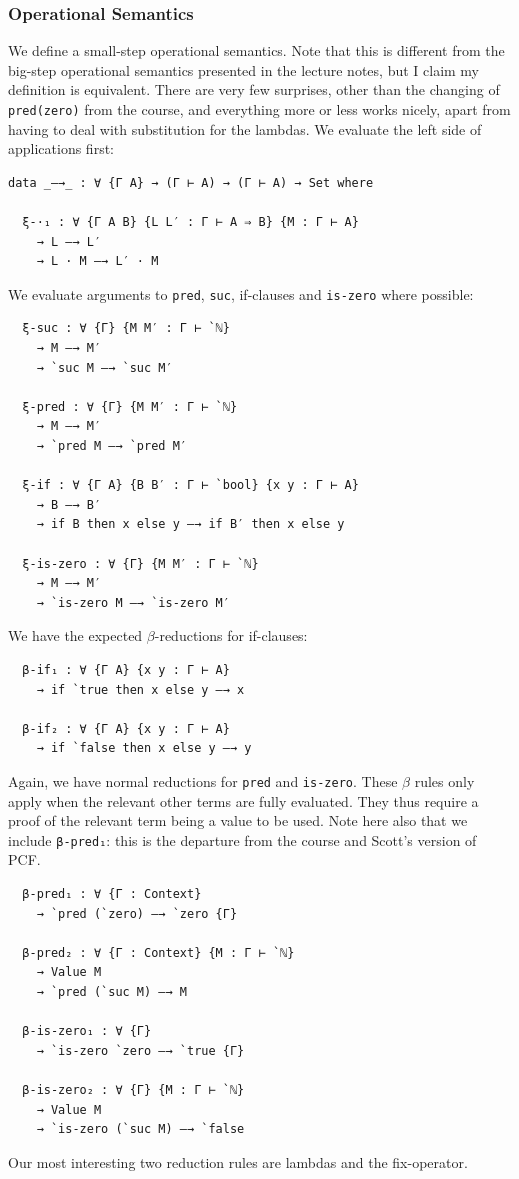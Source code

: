 \documentclass[12pt,a4paper,twoside,openright]{report}
\begin{document}
\subsubsection{Operational Semantics}
We define a small-step operational semantics. Note that this is different from the big-step operational semantics presented in the lecture notes, but I claim my definition is equivalent. There are very few surprises, other than the changing of \texttt{pred(zero)} from the course, and everything more or less works nicely, apart from having to deal with substitution for the lambdas.
We evaluate the left side of applications first:
\begin{verbatim}
data _—→_ : ∀ {Γ A} → (Γ ⊢ A) → (Γ ⊢ A) → Set where

  ξ-·₁ : ∀ {Γ A B} {L L′ : Γ ⊢ A ⇒ B} {M : Γ ⊢ A}
    → L —→ L′
    → L · M —→ L′ · M
\end{verbatim}
We evaluate arguments to \texttt{pred}, \texttt{suc}, if-clauses and \texttt{is-zero} where possible:
\begin{multicols}{2}
\begin{verbatim}
  ξ-suc : ∀ {Γ} {M M′ : Γ ⊢ `ℕ}
    → M —→ M′
    → `suc M —→ `suc M′

  ξ-pred : ∀ {Γ} {M M′ : Γ ⊢ `ℕ}
    → M —→ M′
    → `pred M —→ `pred M′
  
  ξ-if : ∀ {Γ A} {B B′ : Γ ⊢ `bool} {x y : Γ ⊢ A}
    → B —→ B′
    → if B then x else y —→ if B′ then x else y

  ξ-is-zero : ∀ {Γ} {M M′ : Γ ⊢ `ℕ}
    → M —→ M′
    → `is-zero M —→ `is-zero M′
\end{verbatim}
\end{multicols}
We have the expected $\beta$-reductions for if-clauses:
\begin{multicols}{2}
\begin{verbatim}
  β-if₁ : ∀ {Γ A} {x y : Γ ⊢ A}
    → if `true then x else y —→ x

  β-if₂ : ∀ {Γ A} {x y : Γ ⊢ A}
    → if `false then x else y —→ y
\end{verbatim}
\end{multicols}
Again, we have normal reductions for \texttt{pred} and \texttt{is-zero}. These $\beta$ rules only apply when the relevant other terms are fully evaluated. They thus require a proof of the relevant term being a value to be used. Note here also that we include \texttt{β-pred₁}: this is the departure from the course and Scott's version of PCF. 
\begin{multicols}{2}
\begin{verbatim}
  β-pred₁ : ∀ {Γ : Context}
    → `pred (`zero) —→ `zero {Γ}

  β-pred₂ : ∀ {Γ : Context} {M : Γ ⊢ `ℕ}
    → Value M
    → `pred (`suc M) —→ M

  β-is-zero₁ : ∀ {Γ}
    → `is-zero `zero —→ `true {Γ}

  β-is-zero₂ : ∀ {Γ} {M : Γ ⊢ `ℕ}
    → Value M
    → `is-zero (`suc M) —→ `false 
\end{verbatim}
\end{multicols}
Our most interesting two reduction rules are lambdas and the fix-operator. 
\end{document}
